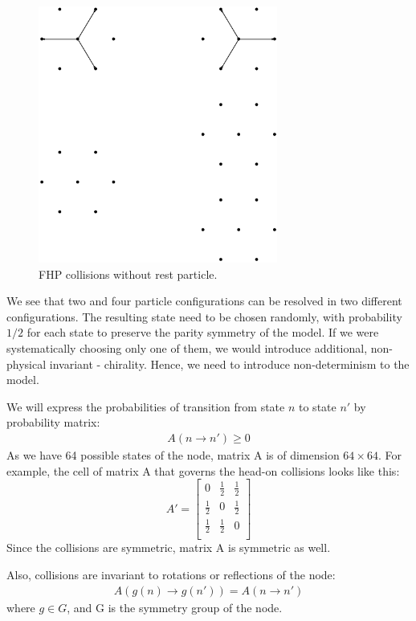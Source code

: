 \begin{figure}[H]
 \centering
 \includegraphics[width=0.7\textwidth]{./img/FHPcol}
 \caption{FHP collisions without rest particle.}
 \label{FHPcol}
\end{figure}

We see that two and four particle configurations can be resolved in two different configurations. The resulting state need to be chosen randomly, with probability $1/2$ for each state to preserve the parity symmetry of the model. If we were systematically choosing only one of them, we would introduce additional, non-physical invariant - chirality. Hence, we need to introduce non-determinism to the model.


We will express the probabilities of transition from state $n$ to state $n'$ by probability matrix:
\begin{align*}
A(n \rightarrow n') \geq 0
\end{align*}
As we have 64 possible states of the node, matrix A is of dimension $64\times 64$.
For example, the cell of matrix A that governs the head-on collisions looks like this:
\[
 A'=
  \begin{bmatrix}
    0 & \frac{1}{2} & \frac{1}{2} \\
    \frac{1}{2} & 0 & \frac{1}{2} \\
    \frac{1}{2} & \frac{1}{2} & 0 \\
  \end{bmatrix}
\]
Since the collisions are symmetric, matrix A is symmetric as well.

Also, collisions are invariant to rotations or reflections of the node:
\begin{align*}
A(g(n) \rightarrow g(n')) = A(n \rightarrow n')
\end{align*}
where $g \in G$, and G is the symmetry group of the node.


